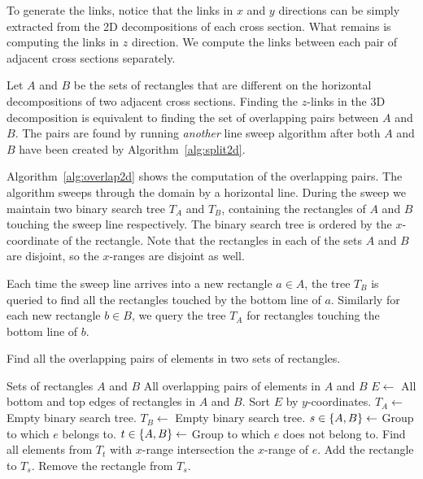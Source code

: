 \documentclass[english,gradu]{tktltiki2018}
\begin{document}
To generate the links, notice that the links in $x$ and $y$ directions can be simply extracted from the 2D decompositions of each cross section.
What remains is computing the links in $z$ direction.
We compute the links between each pair of adjacent cross sections separately.

Let $A$ and $B$ be the sets of rectangles that are different on the horizontal decompositions of two adjacent cross sections.
Finding the $z$-links in the 3D decomposition is equivalent to finding the set of overlapping pairs between $A$ and $B$.
The pairs are found by running \emph{another} line sweep algorithm after both $A$ and $B$ have been created by Algorithm~\ref{alg:split2d}.

Algorithm~\ref{alg:overlap2d} shows the computation of the overlapping pairs.
The algorithm sweeps through the domain by a horizontal line.
During the sweep we maintain two binary search tree $T_A$ and $T_B$, containing the rectangles of $A$ and $B$ touching the sweep line respectively.
The binary search tree is ordered by the $x$-coordinate of the rectangle.
Note that the rectangles in each of the sets $A$ and $B$ are disjoint, so the $x$-ranges are disjoint as well.

Each time the sweep line arrives into a new rectangle $a\in A$, the tree $T_B$ is queried to find all the rectangles touched by the bottom line of $a$.
Similarly for each new rectangle $b\in B$, we query the tree $T_A$ for rectangles touching the bottom line of $b$.

\begin{algorithm}
\caption{Find all the overlapping pairs of elements in two sets of rectangles.}\label{alg:overlap2d}
\begin{algorithmic}
\Require Sets of rectangles $A$ and $B$
\Ensure All overlapping pairs of elements in $A$ and $B$
\State $E\gets$ All bottom and top edges of rectangles in $A$ and $B$.
\State Sort $E$ by $y$-coordinates.
\State $T_A\gets$ Empty binary search tree.
\State $T_B\gets$ Empty binary search tree.
	\State $s\in\left\{A,B\right\}\gets$ Group to which $e$ belongs to.
	\State $t\in\left\{A,B\right\}\gets$ Group to which $e$ does not belong to.
		\State Find all elements from $T_t$ with $x$-range intersection the $x$-range of $e$.
		\State Add the rectangle to $T_s$.
	\Else
		\State Remove the rectangle from $T_s$.
	\EndIf
\EndFor
\end{algorithmic}
\end{algorithm}
\end{document}
